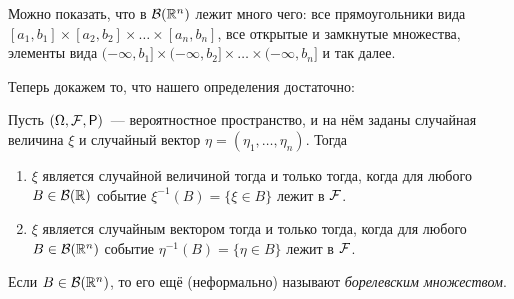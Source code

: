 \begin{remark}
	Можно показать, что в \(\mathcal{B}(\mathbb{R}^n)\) лежит много чего: все прямоугольники вида \([a_1,  b_1] \times [a_2, b_2] \times \dots \times [a_n, b_n]\), все открытые и замкнутые множества, элементы вида \((-\infty,  b_1] \times (-\infty, b_2] \times \dots \times (-\infty, b_n]\) и так далее.
\end{remark}
Теперь докажем то, что нашего определения достаточно:
\begin{lemma}
	Пусть \((\Omega, \F, \Pr)\)~--- вероятностное пространство, и на нём заданы случайная величина \(\xi\) и случайный вектор \(\eta = (\eta_1, \dots, \eta_n)\). Тогда
	\begin{enumerate}
		\item \(\xi\) является случайной величиной тогда и только тогда, когда для любого \(B \in \mathcal{B}(\mathbb{R})\) событие \(\xi^{-1}(B) = \{\xi \in B\}\) лежит в \(\mathcal{F}\).
		\item \(\xi\) является случайным вектором тогда и только тогда, когда для любого \(B \in \mathcal{B}(\mathbb{R}^n)\) событие \(\eta^{-1}(B) = \{\eta \in B\}\) лежит в \(\mathcal{F}\).
	\end{enumerate}
\end{lemma}
\begin{remark}
	Если \(B \in \mathcal{B}(\mathbb{R}^n)\), то его ещё (неформально) называют \emph{борелевским множеством}.
\end{remark}

